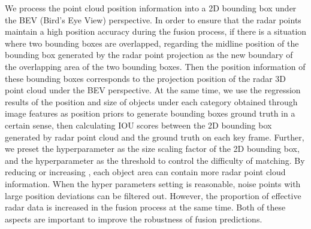\documentclass[10pt,twocolumn,letterpaper]{article}
\begin{document}
We process the point cloud position information into a 2D bounding box under the BEV (Bird's Eye View) perspective. In order to ensure that the radar points maintain a high position accuracy during the fusion process, if there is a situation where two bounding boxes are overlapped, regarding the midline position of the bounding box generated by the radar point projection as the new boundary of the overlapping area of the two bounding boxes. Then the position information of these bounding boxes corresponds to the projection position of the radar 3D point cloud under the BEV perspective. At the same time, we use the regression results of the position and size of objects under each category obtained through image features as position priors to generate bounding boxes ground truth in a certain sense, then calculating IOU scores between the 2D bounding box generated by radar point cloud and the ground truth on each key frame. Further, we preset the hyperparameter  as the size scaling factor of the 2D bounding box, and the hyperparameter  as the threshold to control the difficulty of matching. By reducing   or increasing , each object area can contain more radar point cloud information. When the hyper parameters setting is reasonable, noise points with large position deviations can be filtered out. However, the proportion of effective radar data is increased in the fusion process at the same time. Both of these aspects are important to improve the robustness of fusion predictions.
\end{document}
